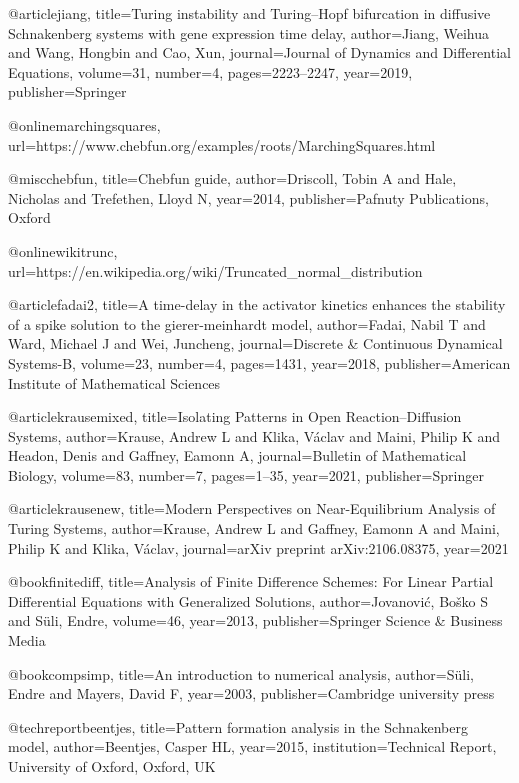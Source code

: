 @article{jiang,
  title={Turing instability and Turing--Hopf bifurcation in diffusive Schnakenberg systems with gene expression time delay},
  author={Jiang, Weihua and Wang, Hongbin and Cao, Xun},
  journal={Journal of Dynamics and Differential Equations},
  volume={31},
  number={4},
  pages={2223--2247},
  year={2019},
  publisher={Springer}
}

@online{marchingsquares,
url={https://www.chebfun.org/examples/roots/MarchingSquares.html}
}

@misc{chebfun,
  title={Chebfun guide},
  author={Driscoll, Tobin A and Hale, Nicholas and Trefethen, Lloyd N},
  year={2014},
  publisher={Pafnuty Publications, Oxford}
}

@online{wikitrunc,
url={https://en.wikipedia.org/wiki/Truncated_normal_distribution}
}

@article{fadai2,
  title={A time-delay in the activator kinetics enhances the stability of a spike solution to the gierer-meinhardt model},
  author={Fadai, Nabil T and Ward, Michael J and Wei, Juncheng},
  journal={Discrete \& Continuous Dynamical Systems-B},
  volume={23},
  number={4},
  pages={1431},
  year={2018},
  publisher={American Institute of Mathematical Sciences}
}


@article{krausemixed,
  title={Isolating Patterns in Open Reaction--Diffusion Systems},
  author={Krause, Andrew L and Klika, V{\'a}clav and Maini, Philip K and Headon, Denis and Gaffney, Eamonn A},
  journal={Bulletin of Mathematical Biology},
  volume={83},
  number={7},
  pages={1--35},
  year={2021},
  publisher={Springer}
}

@article{krausenew,
  title={Modern Perspectives on Near-Equilibrium Analysis of Turing Systems},
  author={Krause, Andrew L and Gaffney, Eamonn A and Maini, Philip K and Klika, V{\'a}clav},
  journal={arXiv preprint arXiv:2106.08375},
  year={2021}
}

@book{finitediff,
  title={Analysis of Finite Difference Schemes: For Linear Partial Differential Equations with Generalized Solutions},
  author={Jovanovi{\'c}, Bo{\v{s}}ko S and S{\"u}li, Endre},
  volume={46},
  year={2013},
  publisher={Springer Science \& Business Media}
}

@book{compsimp,
  title={An introduction to numerical analysis},
  author={S{\"u}li, Endre and Mayers, David F},
  year={2003},
  publisher={Cambridge university press}
}


@techreport{beentjes,
  title={Pattern formation analysis in the Schnakenberg model},
  author={Beentjes, Casper HL},
  year={2015},
  institution={Technical Report, University of Oxford, Oxford, UK}
}

